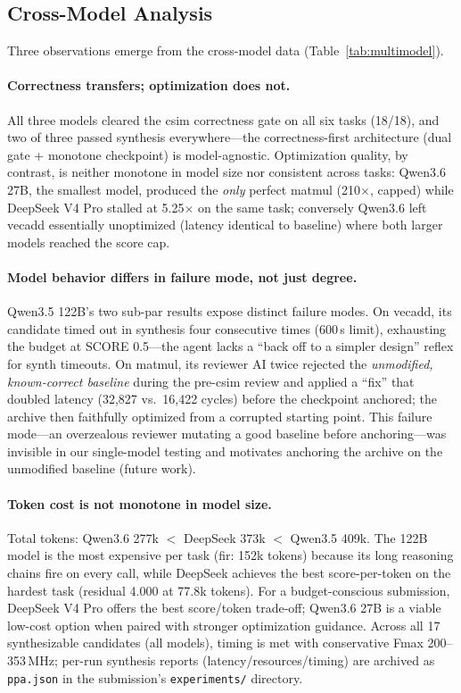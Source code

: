 \documentclass[10pt,conference,letterpaper]{IEEEtran}
\begin{document}
\subsection{Cross-Model Analysis}

Three observations emerge from the cross-model data (Table~\ref{tab:multimodel}).

\paragraph{Correctness transfers; optimization does not.} All three models cleared the csim correctness gate on all six tasks (18/18), and two of three passed synthesis everywhere---the correctness-first architecture (dual gate + monotone checkpoint) is model-agnostic. Optimization quality, by contrast, is neither monotone in model size nor consistent across tasks: Qwen3.6 27B, the smallest model, produced the \emph{only} perfect matmul (210$\times$, capped) while DeepSeek V4 Pro stalled at 5.25$\times$ on the same task; conversely Qwen3.6 left vecadd essentially unoptimized (latency identical to baseline) where both larger models reached the score cap.

\paragraph{Model behavior differs in failure mode, not just degree.} Qwen3.5 122B's two sub-par results expose distinct failure modes. On vecadd, its candidate timed out in synthesis four consecutive times (600\,s limit), exhausting the budget at SCORE 0.5---the agent lacks a ``back off to a simpler design'' reflex for synth timeouts. On matmul, its reviewer AI twice rejected the \emph{unmodified, known-correct baseline} during the pre-csim review and applied a ``fix'' that doubled latency (32,827 vs.\ 16,422 cycles) before the checkpoint anchored; the archive then faithfully optimized from a corrupted starting point. This failure mode---an overzealous reviewer mutating a good baseline before anchoring---was invisible in our single-model testing and motivates anchoring the archive on the unmodified baseline (future work).

\paragraph{Token cost is not monotone in model size.} Total tokens: Qwen3.6 277k $<$ DeepSeek 373k $<$ Qwen3.5 409k. The 122B model is the most expensive per task (fir: 152k tokens) because its long reasoning chains fire on every call, while DeepSeek achieves the best score-per-token on the hardest task (residual 4.000 at 77.8k tokens). For a budget-conscious submission, DeepSeek V4 Pro offers the best score/token trade-off; Qwen3.6 27B is a viable low-cost option when paired with stronger optimization guidance. Across all 17 synthesizable candidates (all models), timing is met with conservative Fmax 200--353\,MHz; per-run synthesis reports (latency/resources/timing) are archived as \texttt{ppa.json} in the submission's \texttt{experiments/} directory.
\end{document}
